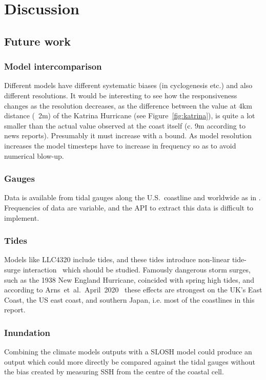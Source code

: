 \section{Discussion}
\label{sec:7_Discussion}

\subsection{Future work}
\label{sec:future}
\subsubsection{Model intercomparison}
Different models have different systematic biases (in cyclogenesis etc.)
and also different resolutions. It would be interesting to see how
the responsiveness changes as the resolution decreases, as the difference
between the value at 4km distance (~2m) of the Katrina Hurricane (see Figure~\ref{fig:katrina}),
is quite a lot smaller than the actual value observed at the coast itself (c. 9m according to news reports).
Presumably it must increase with a bound. As model resolution increases the model
timesteps have to increase in frequency so as to avoid numerical blow-up.

\subsubsection{Gauges}
Data is available from tidal gauges along the U.S.~coastline and worldwide as
in \cite{tadesse2020data, arns2020non}.
Frequencies of data are variable, and the API to extract this data
is difficult to implement.

\subsubsection{Tides}
Models like LLC4320 include tides, and these tides introduce
non-linear tide-surge interaction~\cite{feng2019characteristics, arns2020non} which should be studied.
Famously dangerous storm surges, such as the 1938 New England
Hurricane, coincided with spring high tides, and according to Arns~et~al.~April~2020~\cite{arns2020non}
these effects are strongest on the UK's East Coast,
the US east coast, and southern Japan, i.e. most of the coastlines in
this report.

\subsubsection{Inundation}
Combining the climate models outputs with a SLOSH model could produce
an output which could more directly be compared against the tidal gauges
without the bias created by measuring SSH from the centre of the coastal
cell.



